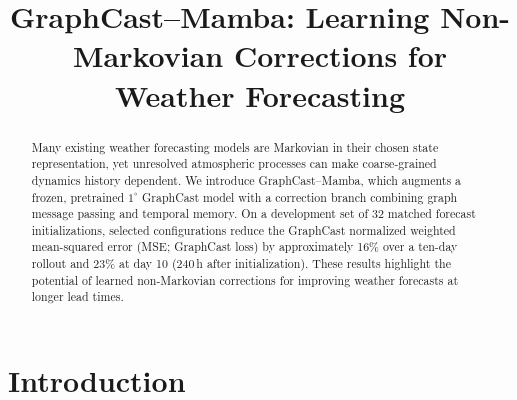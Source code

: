 \documentclass{article}
\title{GraphCast--Mamba: Learning Non-Markovian Corrections for Weather Forecasting}
\author{
}
\newcommand{\suozhi}[1]{\textcolor{blue}{[suozhi: #1]}}
\renewcommand{\suozhi}[1]{}
\begin{document}
\maketitle

\suozhi{The title is too general. Please name Mamba explicitly and emphasize its ability to capture non-Markovian effects in weather prediction.}

\begin{abstract}
Many existing weather forecasting models are Markovian in their chosen state representation, yet unresolved atmospheric processes can make coarse-grained dynamics history dependent. We introduce GraphCast--Mamba, which augments a frozen, pretrained \(1^\circ\) GraphCast model with a correction branch combining graph message passing and temporal memory. On a development set of 32 matched forecast initializations, selected configurations reduce the GraphCast normalized weighted mean-squared error (MSE; GraphCast loss) by approximately 16\% over a ten-day rollout and 23\% at day 10 (240\,h after initialization). These results highlight the potential of learned non-Markovian corrections for improving weather forecasts at longer lead times.
\par\suozhi{The abstract is too short and should be expanded.}
\par\suozhi{Please explain terms such as ``day ten'' at their first occurrence so readers can understand the forecast horizon.}
\end{abstract}



\section{Introduction}
\end{document}
